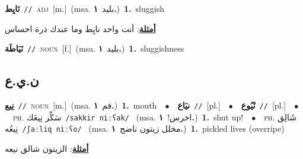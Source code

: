 \documentclass[10pt,a4paper,twoside]{article} %
\begin{document}
\begin{multicols}{2}
{\setlength\topsep{0pt}\textbf{\foreignlanguage{arabic}{نَايِط}}\ {\color{gray}\texttt{//}\color{black}}\ \textsc{adj}\ [m.]\ \color{gray}(msa. \foreignlanguage{arabic}{بليد}~\foreignlanguage{arabic}{\textbf{١.}})\color{black}\ \textbf{1.}~sluggish\  \begin{flushright}\color{gray}\foreignlanguage{arabic}{\textbf{\underline{\foreignlanguage{arabic}{أمثلة}}}: أنت واحد نايِط وما عندك ذرة احساس}\end{flushright}\color{black}} \vspace{2mm}

{\setlength\topsep{0pt}\textbf{\foreignlanguage{arabic}{نَيَاطَة}}\ {\color{gray}\texttt{//}\color{black}}\ \textsc{noun}\ [f.]\ \color{gray}(msa. \foreignlanguage{arabic}{بليد}~\foreignlanguage{arabic}{\textbf{١.}})\color{black}\ \textbf{1.}~sluggishness\ } \vspace{2mm}

\vspace{-3mm}
\subsection*{\color{blue}\foreignlanguage{arabic}{ن.ي.ع}\color{blue}{}} 

{\setlength\topsep{0pt}\textbf{\foreignlanguage{arabic}{نِيع}}\ {\color{gray}\texttt{//}\color{black}}\ \textsc{noun}\ [m.]\ \color{gray}(msa. \foreignlanguage{arabic}{فم}~\foreignlanguage{arabic}{\textbf{١.}})\color{black}\ \textbf{1.}~mouth\ \ $\bullet$\ \ \setlength\topsep{0pt}\textbf{\foreignlanguage{arabic}{نيَاع}}\ {\color{gray}\texttt{//}\color{black}}\ [pl.]\ \ $\bullet$\ \ \setlength\topsep{0pt}\textbf{\foreignlanguage{arabic}{نْيُوع}}\ {\color{gray}\texttt{//}\color{black}}\ [pl.]\ \ $\bullet$\ \ \textsc{ph.} \color{gray} \foreignlanguage{arabic}{سَكِّر نِيعَك}\color{black}\ {\color{gray}\texttt{/{\sffamily sakkir niːʕak}/}\color{black}}\ \color{gray} (msa. \foreignlanguage{arabic}{اخرس!}~\foreignlanguage{arabic}{\textbf{١.}})\color{black}\ \textbf{1.}~shut up!\ \ $\bullet$\ \ \textsc{ph.} \color{gray} \foreignlanguage{arabic}{شَالِق نِيعُه}\color{black}\ {\color{gray}\texttt{/{\sffamily ʃaːliq niːʕo}/}\color{black}}\ \color{gray} (msa. \foreignlanguage{arabic}{مخلل زيتون ناضج}~\foreignlanguage{arabic}{\textbf{١.}})\color{black}\ \textbf{1.}~pickled lives (overripe)\  \begin{flushright}\color{gray}\foreignlanguage{arabic}{\textbf{\underline{\foreignlanguage{arabic}{أمثلة}}}: الزيتون شالق نيعه}\end{flushright}\color{black}} \vspace{2mm}


\end{multicols}
\end{document}

